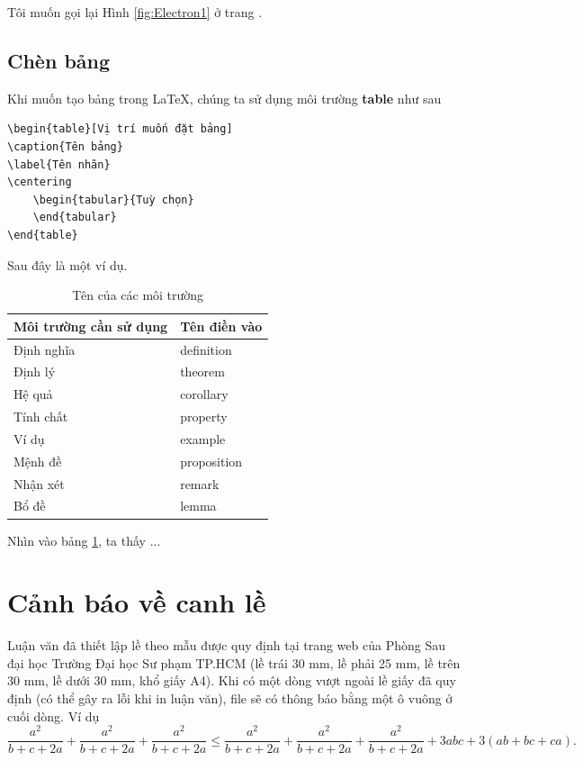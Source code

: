Tôi muốn gọi lại Hình \ref{fig:Electron1} ở trang \pageref{fig:Electron1}.

\subsection{Chèn bảng}
Khi muốn tạo bảng trong LaTeX, chúng ta sử dụng môi trường \textbf{table} như sau 
\begin{verbatim} 
\begin{table}[Vị trí muốn đặt bảng]
\caption{Tên bảng}
\label{Tên nhãn}
\centering
    \begin{tabular}{Tuỳ chọn}
    \end{tabular}
\end{table}
\end{verbatim}
Sau đây là một ví dụ.

\begin{table}[!htp]
\caption{Tên của các môi trường}
\label{tab: Bang1}
\centering
\begin{tabular}{|l|l|}
\hline
\textbf{Môi trường cần sử dụng} & \textbf{Tên điền vào} \\
\hline
Định nghĩa & definition  \\
\hline
Định lý & theorem  \\
\hline
Hệ quả & corollary \\
\hline
Tính chất & property  \\
\hline
Ví dụ & example  \\
\hline
Mệnh đề & proposition  \\
\hline
Nhận xét & remark \\
\hline
Bổ đề & lemma \\
\hline
\end{tabular}
\end{table}

Nhìn vào bảng \ref{tab: Bang1}, ta thấy ...

\section{Cảnh báo về canh lề}
Luận văn đã thiết lập lề theo mẫu được quy định tại trang web của Phòng Sau đại học Trường Đại học Sư phạm TP.HCM (lề trái 30 mm, lề phải 25 mm, lề trên 30 mm, lề dưới 30 mm, khổ giấy A4). Khi có một dòng vượt ngoài lề giấy đã quy định (có thể gây ra lỗi khi in luận văn), file sẽ có thông báo bằng một ô vuông ở cuối dòng. Ví dụ
$$ \dfrac{a^2}{b+c+2a} + \dfrac{a^2}{b+c+2a}  + \dfrac{a^2}{b+c+2a}  \le \dfrac{a^2}{b+c+2a}  + \dfrac{a^2}{b+c+2a}  + \dfrac{a^2}{b+c+2a} + 3abc+ 3(ab+bc+ca).$$

